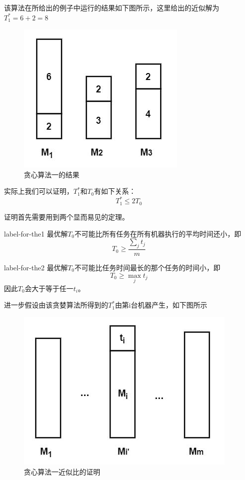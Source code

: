 该算法在所给出的例子中运行的结果如下图所示，这里给出的近似解为$T_1^*=6+2=8$
\begin{figure}[hbt]
	\centering
	\includegraphics{image/greedy1-result.jpg}
	\caption{贪心算法一的结果}\label{fig:greedy1-result}
\end{figure}

实际上我们可以证明，$T_1^*$和$T_0$有如下关系：
\begin{equation*}
	T_1^*\leq 2T_0
\end{equation*}

证明首先需要用到两个显而易见的定理。
\begin{theorem}{}{label-for-the1}
	最优解$T_0$不可能比所有任务在所有机器执行的平均时间还小，即
	\begin{equation*}
		T_0\geq \frac{\sum_j t_j}{m}
	\end{equation*}
\end{theorem}

\begin{theorem}{}{label-for-the2}
	最优解$T_0$不可能比任务时间最长的那个任务的时间小，即
	\begin{equation*}
		T_0\geq \max_j t_j
	\end{equation*}
	因此$T_0$会大于等于任一$t_i$。
\end{theorem}

进一步假设由该贪婪算法所得到的$T_1^*$由第i台机器产生，如下图所示
\begin{figure}[hbt]
	\centering
	\includegraphics{image/greedy1-proof.jpg}
	\caption{贪心算法一近似比的证明}\label{fig:greedy1-proof}
\end{figure}

